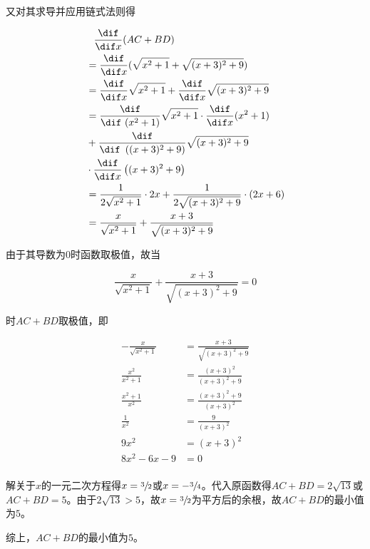 又对其求导并应用链式法则得

\begin{align*}
  &\phantom{=} \frac{\dif}{\dif x}(AC + BD) \\
  &= \frac{\dif}{\dif x}(\sqrt{x^2 + 1} + \sqrt{(x + 3)^2 + 9}) \\
  &= \frac{\dif}{\dif x}\sqrt{x^2 + 1} + \frac{\dif}{\dif x}\sqrt{(x + 3)^2 + 9} \\
  &= \frac{\dif}{\dif\ (x^2 + 1)}\sqrt{x^2 + 1}\cdot \frac{\dif}{\dif x}(x^2 + 1) \\
  &+ \frac{\dif}{\dif\ \left((x + 3)^2 + 9\right)}\sqrt{(x + 3)^2 + 9} \\
  &\cdot \frac{\dif}{\dif x}\left((x + 3)^2 + 9\right) \\
  &= \frac1{2\sqrt{x^2 + 1}}\cdot2x + \frac1{2\sqrt{(x + 3)^2 + 9}}\cdot(2x + 6) \\
  &= \frac x{\sqrt{x^2 + 1}} + \frac{x + 3}{\sqrt{(x + 3)^2 + 9}} \\
\end{align*}

由于其导数为$0$时函数取极值，故当

\[ \frac x{\sqrt{x^2 + 1}} + \frac{x + 3}{\sqrt{(x + 3)^2 + 9}} = 0 \]

时$AC + BD$取极值，即

\begin{align*}
  -\frac x{\sqrt{x^2 + 1}} &= \frac{x + 3}{\sqrt{(x + 3)^2 + 9}} \\
  \frac{x^2}{x^2 + 1} &= \frac{(x + 3)^2}{(x + 3)^2 + 9} \\
  \frac{x^2 + 1}{x^2} &= \frac{(x + 3)^2 + 9}{(x + 3)^2} \\
  \frac1{x^2} &= \frac9{(x + 3)^2} \\
  9x^2 &= (x + 3)^2 \\
  8x^2 - 6x - 9 &= 0 \\
\end{align*}

解关于$x$的一元二次方程得$x = \sfrac32$或$x = -\sfrac34$。代入原函数得$AC + BD = 2\sqrt{13}$或$AC + BD = 5$。由于$2\sqrt{13} > 5$，故$x = \sfrac32$为平方后的余根，故$AC + BD$的最小值为$5$。

综上，$AC + BD$的最小值为$5$。
